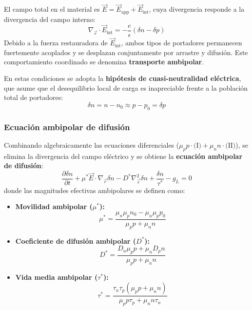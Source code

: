 El campo total en el material es $\vec{E} = \vec{E}_{\text{app}} + \vec{E}_{\text{int}}$, cuya divergencia responde a la divergencia del campo interno:
\[
\nabla_{\vec{r}} \cdot \vec{E}_{\text{int}} = -\frac{e}{\epsilon} (\delta n - \delta p)
\]
Debido a la fuerza restauradora de $\vec{E}_{\text{int}}$, ambos tipos de portadores permanecen fuertemente acoplados y se desplazan conjuntamente por arrastre y difusión. Este comportamiento coordinado se denomina \textbf{transporte ambipolar}.

En estas condiciones se adopta la \textbf{hipótesis de cuasi-neutralidad eléctrica}, que asume que el desequilibrio local de carga es inapreciable frente a la población total de portadores:
\[
\delta n = n - n_0 \approx p - p_0 = \delta p
\]

\subsubsection{Ecuación ambipolar de difusión}

Combinando algebraicamente las ecuaciones diferenciales ($\mu_p p \cdot \text{(I)} + \mu_n n \cdot \text{(II)}$), se elimina la divergencia del campo eléctrico y se obtiene la \textbf{ecuación ambipolar de difusión}:
\[
\frac{\partial \delta n}{\partial t} + \mu^* \vec{E} \cdot \nabla_{\vec{r}} \delta n - D^* \nabla_{\vec{r}}^2 \delta n + \frac{\delta n}{\tau^*} - g_L = 0
\]
donde las magnitudes efectivas ambipolares se definen como:
\begin{itemize}
    \item \textbf{Movilidad ambipolar ($\mu^*$):}
    \[
    \mu^* = \frac{\mu_n \mu_p n_0 - \mu_n \mu_p p_0}{\mu_p p + \mu_n n}
    \]
    \item \textbf{Coeficiente de difusión ambipolar ($D^*$):}
    \[
    D^* = \frac{D_n \mu_p p + \mu_n D_p n}{\mu_p p + \mu_n n}
    \]
    \item \textbf{Vida media ambipolar ($\tau^*$):}
    \[
    \tau^* = \frac{\tau_n \tau_p (\mu_p p + \mu_n n)}{\mu_p p \tau_p + \mu_n n \tau_n}
    \]
\end{itemize}

